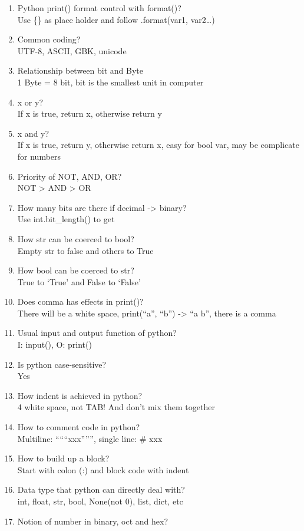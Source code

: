 \documentclass[10pt,a4paper,oneside]{article}
\begin{document}
\begin{enumerate}[1.]
\item Python print() format control with format()?\\
Use \{\} as place holder and follow .format(var1, var2…)
\item Common coding?\\
UTF-8, ASCII, GBK, unicode
\item Relationship between bit and Byte\\
1 Byte = 8 bit, bit is the smallest unit in computer
\item x or y?\\
If x is true, return x, otherwise return y
\item x and y?\\
If x is true, return y, otherwise return x, easy for bool var, may be complicate for numbers
\item Priority of NOT, AND, OR?\\
NOT > AND > OR
\item How many bits are there if decimal -> binary?\\
Use int.bit\_length() to get
\item How str can be coerced to bool?\\
Empty str to false and others to True
\item How bool can be coerced to str?\\
True to `True' and False to `False'
\item Does comma has effects in print()?\\
There will be a white space, print(``a'', ``b'') -> ``a b'', there is a comma
\item Usual input and output function of python?\\
I: input(), O: print()
\item Is python case-sensitive?\\
Yes
\item How indent is achieved in python?\\
4 white space, not TAB! And don't mix them together
\item How to comment code in python?\\
Multiline: ``````xxx'''''', single line: \# xxx
\item How to build up a block?\\
 Start with colon (:) and block code with indent
 \item Data type that python can directly deal with?\\
 int, float, str, bool, None(not 0), list, dict, etc
 \item Notion of number in binary, oct and hex?\\

\end{enumerate}
\end{document}
